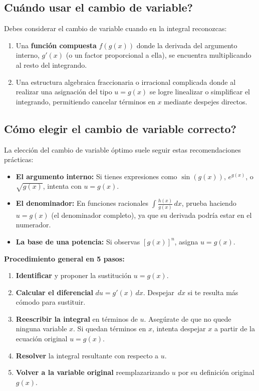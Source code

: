 \documentclass[12pt, letterpaper]{article}
\newcommand{\dx}{\,dx}
\begin{document}
\subsection{\textquestiondown Cuándo usar el cambio de variable?}
Debes considerar el cambio de variable cuando en la integral reconozcas:
\begin{enumerate}[label=\alph*)]
  \item Una \textbf{función compuesta} $f(g(x))$ donde la derivada del argumento interno, $g'(x)$ (o un factor proporcional a ella), se encuentra multiplicando al resto del integrando.
  \item Una estructura algebraica fraccionaria o irracional complicada donde al realizar una asignación del tipo $u = g(x)$ se logre linealizar o simplificar el integrando, permitiendo cancelar términos en $x$ mediante despejes directos.
\end{enumerate}

\subsection{\textquestiondown Cómo elegir el cambio de variable correcto?}
La elección del cambio de variable óptimo suele seguir estas recomendaciones prácticas:
\begin{cuadrosolucion}
\begin{itemize}[leftmargin=*, label=\checkmark]
  \item \textbf{El argumento interno:} Si tienes expresiones como $\sin(g(x))$, $e^{g(x)}$, o $\sqrt{g(x)}$, intenta con $u = g(x)$.
  \item \textbf{El denominador:} En funciones racionales $\int \frac{h(x)}{g(x)} \dx$, prueba haciendo $u = g(x)$ (el denominador completo), ya que su derivada podría estar en el numerador.
  \item \textbf{La base de una potencia:} Si observas $[g(x)]^n$, asigna $u = g(x)$.
\end{itemize}
\end{cuadrosolucion}

\noindent\textbf{Procedimiento general en 5 pasos:}
\begin{enumerate}
  \item \textbf{Identificar} y proponer la sustitución $u = g(x)$.
  \item \textbf{Calcular el diferencial} $du = g'(x) \dx$. Despejar $\dx$ si te resulta más cómodo para sustituir.
  \item \textbf{Reescribir la integral} en términos de $u$. Asegúrate de que no quede ninguna variable $x$. Si quedan términos en $x$, intenta despejar $x$ a partir de la ecuación original $u = g(x)$.
  \item \textbf{Resolver} la integral resultante con respecto a $u$.
  \item \textbf{Volver a la variable original} reemplazarizando $u$ por su definición original $g(x)$.
\end{enumerate}
\end{document}
